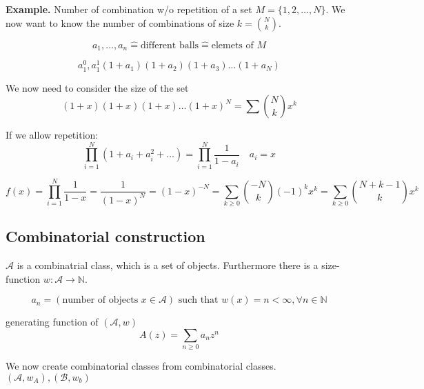 \textbf{Example.} 
Number of combination w/o repetition of a set $M = \{1,2, \ldots ,N\}$. We now want to know the number of combinations of size $k = {N \choose k}$.

\[
    a_1, \ldots , a_n \mathrel{\hat{=}} \text{different balls} \mathrel{\hat{=}} \text{elemets of } M
\]

\[
    a_1^0, a_1^1 
    (1+a_1)(1+a_2)(1+a_3) \ldots (1+a_N)
\]

We now need to consider the size of the set
\[
    (1+x)(1+x)(1+x) \ldots (1+x)^N = \sum {N \choose k} x^k
\]

If we allow repetition: 
\[
    \prod _{i=1}^N (1+a_i + a_i^2 + \ldots) = \prod _{i=1}^N \frac{1}{1-a_i} \quad a_i = x
\]

\[
    f(x) = \prod _{i=1}^N \frac{1}{1-x} = \frac{1}{(1-x)^N} 
    = (1-x)^{-N} 
    = \sum _{k \geq 0} {-N \choose k} (-1)^k x^k
    = \sum _{k \geq 0} {N + k-1 \choose k} x^k
\]

\subsection{Combinatorial construction}
$\mathcal{A}$ is a combinatrial class, which is a set of objects. 
Furthermore there is a size-function $w: \mathcal{A} \rightarrow \mathbb{N}$. 

\[
a_n = \left(\text{number of objects } x\in \mathcal{A}\right) \text{ such that }w(x) = n < \infty,  \forall n \in \mathbb{N}
\]

generating function of $(\mathcal{A}, w)$ 
\[
    A(z) = \sum_{n\geq 0 } a_n z^n
\]

We now create combinatorial classes from combinatorial classes.
$(\mathcal{A}, w_A) , (\mathcal{B}, w_b)$

